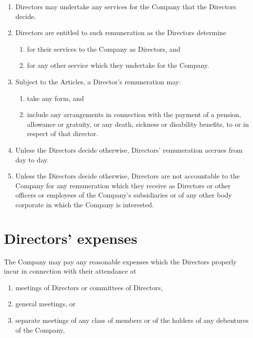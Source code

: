 \documentclass[a4paper,12pt]{article}
\renewcommand{\labelenumi}{\thesection.\arabic{enumi}}
\renewcommand{\labelenumii}{(\alph{enumii})}
\begin{document}
\begin{enumerate}
  \item Directors may undertake any services for the Company that the Directors decide.
  \item Directors are entitled to such remuneration as the Directors determine
  \begin{enumerate}
    \renewcommand{\labelenumii}{(\alph{enumii})}
    \item for their services to the Company as Directors, and
    \item for any other service which they undertake for the Company.
  \end{enumerate}
  \item	Subject to the Articles, a Director's remuneration may:
  \begin{enumerate}
    \item take any form, and
    \item include any arrangements in connection with the payment of a pension, allowance or gratuity, or any death, sickness or disability benefits, to or in respect of that director.
  \end{enumerate}
  \item Unless the Directors decide otherwise, Directors' remuneration accrues from day to day.
  \item	Unless the Directors decide otherwise, Directors are not accountable to the Company for any remuneration which they receive as Directors or other officers or employees of the Company's subsidiaries or of any other body corporate in which the Company is interested.
\end{enumerate}

\section{Directors' expenses}

The Company may pay any reasonable expenses which the Directors properly incur in connection with their attendance at

\begin{enumerate}
  \renewcommand{\labelenumi}{(\alph{enumi})}
  \item meetings of Directors or committees of Directors,
  \item general meetings, or
  \item separate meetings of any class of members or of the holders of any debentures of the Company,
\end{enumerate}
\end{document}
